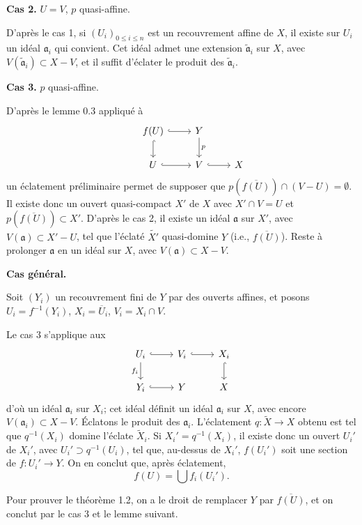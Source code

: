 \documentclass[11pt,a4paper]{article}
\theoremstyle{plain}
\theoremstyle{definition}
\begin{document}
\smallskip
\noindent\textbf{Cas 2.} $U = V$, $p$ quasi-affine.

D'apr\`es le cas 1, si $(U_i)_{0 \leq i \leq n}$ est un recouvrement affine de $X$, il existe sur $U_i$ un id\'eal $\mathfrak{a}_i$ qui convient. Cet id\'eal admet une extension $\widetilde{\mathfrak{a}}_i$ sur $X$, avec $V(\widetilde{\mathfrak{a}}_i) \subset X - V$, et il suffit d'\'eclater le produit des $\widetilde{\mathfrak{a}}_i$.

\smallskip
\noindent\textbf{Cas 3.} $p$ quasi-affine.

D'apr\`es le lemme 0.3 appliqu\'e \`a
\[
\begin{tikzcd}
& f(U) \arrow[d, hook] \arrow[r, hook] & Y \arrow[d, "p"] \\
& U \arrow[r, hook] & V \arrow[r, hook] & X
\end{tikzcd}
\]
un \'eclatement pr\'eliminaire permet de supposer que $p(\overline{f(U)}) \cap (V - U) = \emptyset$. Il existe donc un ouvert quasi-compact $X'$ de $X$ avec $X' \cap V = U$ et $p(\overline{f(U)}) \subset X'$. D'apr\`es le cas 2, il existe un id\'eal $\mathfrak{a}$ sur $X'$, avec $V(\mathfrak{a}) \subset X' - U$, tel que l'\'eclat\'e $\widetilde{X'}$ quasi-domine $Y$ (i.e., $\overline{f(U)}$). Reste \`a prolonger $\mathfrak{a}$ en un id\'eal sur $X$, avec $V(\mathfrak{a}) \subset X - V$.

\smallskip
\noindent\textbf{Cas g\'en\'eral.}

Soit $(Y_i)$ un recouvrement fini de $Y$ par des ouverts affines, et posons $U_i = f^{-1}(Y_i)$, $X_i = \overline{U}_i$, $V_i = X_i \cap V$.

Le cas 3 s'applique aux
\[
\begin{tikzcd}
U_i \arrow[r, hook] \arrow[d, "f_i"'] & V_i \arrow[r, hook] & X_i \arrow[d, hook] \\
Y_i \arrow[r, hook] & Y & X
\end{tikzcd}
\]
d'o\`u un id\'eal $\mathfrak{a}_i$ sur $X_i$; cet id\'eal d\'efinit un id\'eal $\mathfrak{a}_i$ sur $X$, avec encore $V(\mathfrak{a}_i) \subset X - V$. \'Eclatons le produit des $\mathfrak{a}_i$. L'\'eclatement $q: \widetilde{X} \to X$ obtenu est tel que $q^{-1}(X_i)$ domine l'\'eclate $\widetilde{X}_i$. Si $X_i' = q^{-1}(X_i)$, il existe donc un ouvert $U_i'$ de $X_i'$, avec $U_i' \supset q^{-1}(U_i)$, tel que, au-dessus de $X_i'$, $f(U_i')$ soit une section de $f: U_i' \to Y$. On en conclut que, apr\`es \'eclatement,
\[
f(U) = \bigcup f_i(U_i').
\]

Pour prouver le th\'eor\`eme 1.2, on a le droit de remplacer $Y$ par $\overline{f(U)}$, et on conclut par le cas 3 et le lemme suivant.
\end{document}
